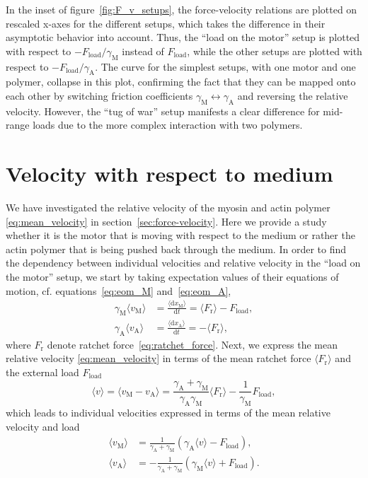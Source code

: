 \documentclass[aps,pre,twocolumn,showpacs,showkeys,superscriptaddress,floatfix]{revtex4-1}
\newcommand{\rmd}{{\mathrm d}}
\begin{document}
In the inset of figure~\ref{fig:F_v_setups}, 
the force-velocity relations are plotted on rescaled x-axes for the different setups, 
which takes the difference in their asymptotic behavior into account. 
Thus, the ``load on the motor'' setup is plotted with respect to $ - F_\text{load} / \gamma_\text{M}$ instead of $F_\text{load}$,
while the other setups are plotted with respect to $ - F_\text{load} / \gamma_\text{A}$.
The curve for the simplest setups, with one motor and one polymer, collapse in this plot, 
confirming the fact that they can be mapped onto each other by switching friction coefficients $\gamma_\text{M} \leftrightarrow \gamma_\text{A}$ 
and reversing the relative velocity. 
However, the ``tug of war'' setup manifests a clear difference for mid-range loads due to the more complex interaction with two polymers. 


\section{Velocity with respect to medium}
\label{sec:ind_velo}
We have investigated the relative velocity of the myosin and actin polymer \eqref{eq:mean_velocity} in section~\ref{sec:force-velocity}. 
Here we provide a study whether it is the motor that is moving with respect to the medium or rather the actin polymer that is being pushed back through the medium.
In order to find the dependency between individual velocities and relative velocity in the ``load on the motor'' setup, 
we start by taking expectation values of their equations of motion, cf. equations~\eqref{eq:eom_M} and~\eqref{eq:eom_A},
\begin{align}
\gamma_\text{M} \langle v_\text{M} \rangle &= \frac{ \langle \rmd x_\text{M} \rangle }{\rmd t} = \langle F_\text{r} \rangle - F_\text{load} , 
\label{eq:pre_velocity_M} 
\\
\gamma_\text{A} \langle v_\text{A} \rangle &= \frac{ \langle \rmd x_\text{A} \rangle }{\rmd t} = -\langle F_\text{r} \rangle , 
\label{eq:pre_velocity_A}
\end{align}
where $F_\text{r}$ denote ratchet force~\eqref{eq:ratchet_force}. 
Next, we express the mean relative velocity \eqref{eq:mean_velocity} in terms of the mean ratchet force $\langle F_\text{r} \rangle$ and the external load $F_\text{load}$  
\begin{equation}
\langle v \rangle 
= \langle v_\text{M} - v_\text{A} \rangle 
= \frac{\gamma_\text{A} + \gamma_\text{M}}{\gamma_\text{A} \gamma_\text{M}} \langle F_\text{r} \rangle - \frac{1}{\gamma_\text{M}} F_\text{load} ,
\label{eq:mean_velocity_Fr_Fl}
\end{equation}
which leads to individual velocities expressed in terms of the mean relative velocity and load 
\begin{align}
\langle v_\text{M} \rangle &= \frac{1}{ \gamma_\text{A} + \gamma_\text{M} } \left( \gamma_\text{A} \langle v \rangle - F_\text{load} \right) ,
\label{eq:velocity_M} \\
\langle v_\text{A} \rangle &= -\frac{1}{ \gamma_\text{A} + \gamma_\text{M} } \left( \gamma_\text{M} \langle v \rangle + F_\text{load} \right) .
\label{eq:velocity_A}
\end{align}
\end{document}
